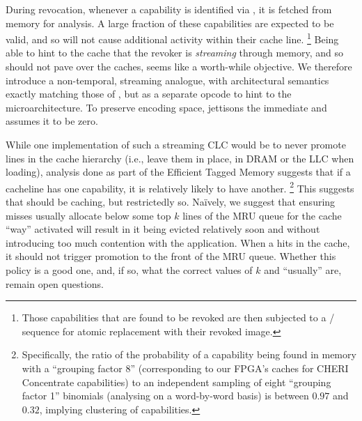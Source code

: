 During revocation, whenever a capability is identified via
, it is fetched from memory for analysis.  A large
fraction of these capabilities are expected to be valid, and so will not
cause additional activity within their cache line.%
%
\footnote{Those capabilities that are found to be revoked are then subjected
to a / sequence for atomic replacement
with their revoked image.}
%
Being able to hint to the cache that the revoker is \emph{streaming} through
memory, and so should not pave over the caches, seems like a worth-while
objective.  We therefore introduce a non-temporal, streaming
 analogue,  with architectural semantics
exactly matching those of , but as a separate opcode to
hint to the microarchitecture.  To preserve encoding space,
 jettisons the immediate and assumes it to be zero.


While one implementation of such a streaming CLC would be to never promote
lines in the cache hierarchy (i.e., leave them in place, in DRAM or the LLC
when loading), analysis done as part of the Efficient Tagged Memory \cite[\S
VI.B]{joannou2017:tagged-memory} suggests that if a cacheline has one
capability, it is relatively likely to have another.%
%
\footnote{Specifically, the ratio of the probability of a capability being
found in memory with a ``grouping factor 8'' (corresponding to our FPGA's
caches for CHERI Concentrate capabilities) to an independent sampling of
eight ``grouping factor 1'' binomials (analysing on a word-by-word basis) is
between $0.97$ and $0.32$, implying clustering of capabilities.}
%
This suggests that  should be caching, but restrictedly
so.  Na\"ively, we suggest that ensuring misses usually allocate below some
top $k$ lines of the MRU queue for the cache ``way'' activated will result
in it being evicted relatively soon and without introducing too much
contention with the application.  When a  hits in the
cache, it should not trigger promotion to the front of the MRU queue.
Whether this policy is a good one, and, if so, what the correct values of
$k$ and ``usually'' are, remain open questions.



